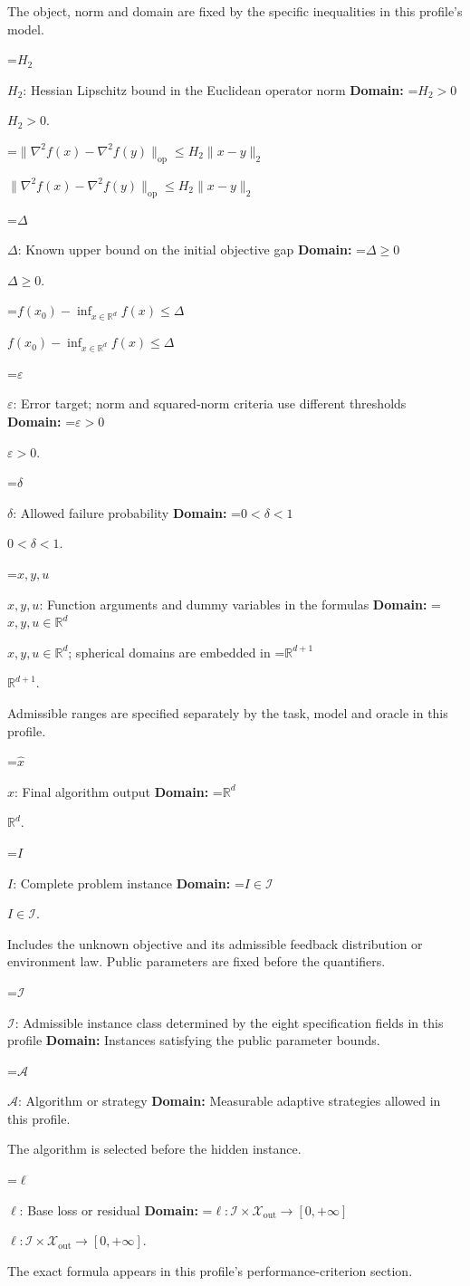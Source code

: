 \documentclass[10pt,a4paper]{article}
\newcommand{\AtlasMath}[1]{\par\begingroup\centering\setbox0=\hbox{$\displaystyle #1$}\ifdim\wd0>1.4\linewidth\typeout{ATLAS WIDE FORMULA: \the\wd0}\fi\ifdim\wd0>\linewidth\resizebox{\linewidth}{!}{\box0}\else\box0\fi\par\endgroup}
\newcommand{\AtlasInlineMath}[1]{\begingroup\setbox0=\hbox{$#1$}\ifdim\wd0>.4\linewidth\endgroup\AtlasMath{#1}\else\endgroup$#1$\fi}
\begin{document}
The object, norm and domain are fixed by the specific inequalities in this profile's model.

\AtlasInlineMath{H_2}: Hessian Lipschitz bound in the Euclidean operator norm \textbf{Domain:} \AtlasInlineMath{H_2>0}.

\AtlasInlineMath{\|\nabla^2f(x)-\nabla^2f(y)\|_{\mathrm{op}}\le H_2\|x-y\|_2}

\AtlasInlineMath{\Delta}: Known upper bound on the initial objective gap \textbf{Domain:} \AtlasInlineMath{\Delta\ge0}.

\AtlasInlineMath{f(x_0)-\inf_{x\in\mathbb{R}^d}f(x)\le\Delta}

\AtlasInlineMath{\varepsilon}: Error target; norm and squared-norm criteria use different thresholds \textbf{Domain:} \AtlasInlineMath{\varepsilon>0}.

\AtlasInlineMath{\delta}: Allowed failure probability \textbf{Domain:} \AtlasInlineMath{0<\delta<1}.

\AtlasInlineMath{x,y,u}: Function arguments and dummy variables in the formulas \textbf{Domain:} \AtlasInlineMath{x,y,u\in\mathbb{R}^d}; spherical domains are embedded in \AtlasInlineMath{\mathbb{R}^{d+1}}.

Admissible ranges are specified separately by the task, model and oracle in this profile.

\AtlasInlineMath{\widehat{x}}: Final algorithm output \textbf{Domain:} \AtlasInlineMath{\mathbb{R}^d}.

\AtlasInlineMath{I}: Complete problem instance \textbf{Domain:} \AtlasInlineMath{I\in\mathcal{I}}.

Includes the unknown objective and its admissible feedback distribution or environment law. Public parameters are fixed before the quantifiers.

\AtlasInlineMath{\mathcal{I}}: Admissible instance class determined by the eight specification fields in this profile \textbf{Domain:} Instances satisfying the public parameter bounds.

\AtlasInlineMath{\mathcal{A}}: Algorithm or strategy \textbf{Domain:} Measurable adaptive strategies allowed in this profile.

The algorithm is selected before the hidden instance.

\AtlasInlineMath{\ell}: Base loss or residual \textbf{Domain:} \AtlasInlineMath{\ell:\mathcal{I}\times\mathcal{X}_{\mathrm{out}}\to[0,+\infty]}.

The exact formula appears in this profile's performance-criterion section.
\end{document}
